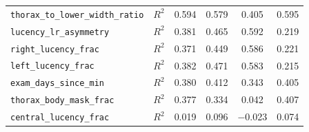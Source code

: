 \begin{tabular}{llcccc}
\texttt{thorax\_to\_lower\_width\_ratio} & $R^2$ & 0.594 & 0.579 & 0.405 & 0.595 \\
\texttt{lucency\_lr\_asymmetry} & $R^2$ & 0.381 & 0.465 & 0.592 & 0.219 \\
\texttt{right\_lucency\_frac} & $R^2$ & 0.371 & 0.449 & 0.586 & 0.221 \\
\texttt{left\_lucency\_frac} & $R^2$ & 0.382 & 0.471 & 0.583 & 0.215 \\
\texttt{exam\_days\_since\_min} & $R^2$ & 0.380 & 0.412 & 0.343 & 0.405 \\
\texttt{thorax\_body\_mask\_frac} & $R^2$ & 0.377 & 0.334 & 0.042 & 0.407 \\
\texttt{central\_lucency\_frac} & $R^2$ & 0.019 & 0.096 & $-$0.023 & 0.074 \\
\bottomrule
\end{tabular}
